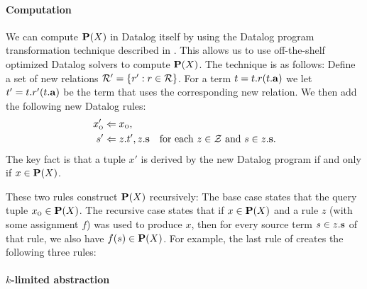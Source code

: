\paragraph{Computation}

We can compute $\mathbf{P}(X)$ in Datalog itself by using the Datalog program transformation technique described in 
\cite{liang11minimal}.
This allows us to use off-the-shelf optimized Datalog solvers to compute $\mathbf{P}(X)$.
The technique is as follows: Define a set of new relations $\mathcal{R}' = \{ r' : r \in \mathcal{R} \}$.
For a term $t = t.r(t.\mathbf{a})$ we let $t' = t.r'(t.\mathbf{a})$ be the term that uses the corresponding new relation.
We then add the following new Datalog rules:
\begin{align}
x_\text{\sc o}' &\Leftarrow x_\text{\sc o}, \label{eqn:revBase} \\
s'   &\Leftarrow z.t', z.\mathbf{s} \quad \text{for each $z \in \mathcal{Z}$ and $s \in z.\mathbf{s}$.} \label{eqn:indBase}
\end{align}
The key fact is that a tuple $x'$ is derived by the new Datalog program if and only if $x \in \mathbf{P}(X)$.

These two rules construct $\mathbf{P}(X)$ recursively:
The base case  states that the query tuple $x_\text{\sc o} \in \mathbf{P}(X)$.
The recursive case  states that if $x \in \mathbf{P}(X)$ and a rule $z$ (with some assignment $f$)
was used to produce $x$, then for every source term $s \in z.\mathbf{s}$ of that rule,
we also have $f(s) \in \mathbf{P}(X)$.
For example, the last rule of  creates the following three rules:
\begin{center}
\end{center}



\paragraph{$k$-limited abstraction}

